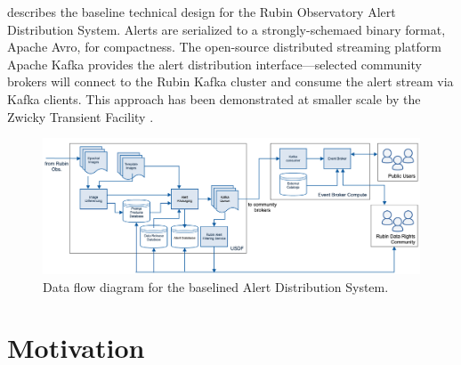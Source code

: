 \documentclass[DM,authoryear,toc]{lsstdoc}
\begin{document}
 describes the baseline technical design for the Rubin Observatory Alert Distribution System.
Alerts are serialized to a strongly-schemaed binary format, Apache Avro, for compactness.
The open-source distributed streaming platform Apache Kafka provides the alert distribution interface---selected community brokers will connect to the Rubin Kafka cluster and consume the alert stream via Kafka clients.
This approach has been demonstrated at smaller scale by the Zwicky Transient Facility \citep{Patterson:19:ZTFAlertDistribution}.


\begin{figure}
  \begin{centering}
  \includegraphics[width=\textwidth]{fig/baseline_alert_dist.png}
  \caption{Data flow diagram for the baselined Alert Distribution System.
  \label{fig:baseline}}
  \end{centering}
\end{figure}


\section{Motivation}
\end{document}
